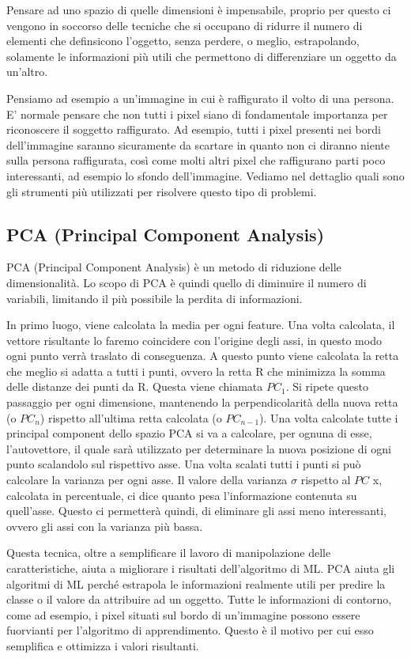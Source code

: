 \documentclass[12pt,italian]{report}
\begin{document}
Pensare ad uno spazio di quelle dimensioni è impensabile, proprio per questo ci vengono in soccorso delle tecniche che si occupano di ridurre il numero di elementi che definsicono l'oggetto, senza perdere, o meglio, estrapolando, solamente le informazioni più utili che permettono di differenziare un oggetto da un'altro.

Pensiamo ad esempio a un'immagine in cui è raffigurato il volto di una persona. E' normale pensare che non tutti i pixel siano di fondamentale importanza per riconoscere il soggetto raffigurato. Ad esempio, tutti i pixel presenti nei bordi dell'immagine saranno sicuramente da scartare in quanto non ci diranno niente sulla persona raffigurata, così come molti altri pixel che raffigurano parti poco interessanti, ad esempio lo sfondo dell'immagine. Vediamo nel dettaglio quali sono gli strumenti più utilizzati per risolvere questo tipo di problemi.


\subsection{PCA (Principal Component Analysis)}
PCA (Principal Component Analysis) è un metodo di riduzione delle dimensionalità. Lo scopo di PCA è quindi quello di diminuire il numero di variabili, limitando il più possibile la perdita di informazioni. 

In primo luogo, viene calcolata la media per ogni feature. Una volta calcolata, il vettore risultante lo faremo coincidere con l'origine degli assi, in questo modo ogni punto verrà traslato di conseguenza. A questo punto viene calcolata la retta che meglio si adatta a tutti i punti, ovvero la retta R che minimizza la somma delle distanze dei punti da R. Questa viene chiamata $ PC_{1} $. Si ripete questo passaggio per ogni dimensione, mantenendo la perpendicolarità della nuova retta (o $ PC_{n} $) rispetto all'ultima retta calcolata (o $ PC_{n-1} $). 
Una volta calcolate tutte i principal component dello spazio PCA si va a calcolare, per ognuna di esse, l'autovettore, il quale sarà utilizzato per determinare la nuova posizione di ogni punto scalandolo sul rispettivo asse. Una volta scalati tutti i punti si può calcolare la varianza per ogni asse. Il valore della varianza $\sigma$ rispetto al $ PC $ x, calcolata in percentuale, ci dice quanto pesa l'informazione contenuta su quell'asse. Questo ci permetterà quindi, di eliminare gli assi meno interessanti, ovvero gli assi con la varianza più bassa. 

Questa tecnica, oltre a semplificare il lavoro di manipolazione delle caratteristiche, aiuta a migliorare i risultati dell'algoritmo di ML. PCA aiuta gli algoritmi di ML perché estrapola le informazioni realmente utili per predire la classe o il valore da attribuire ad un oggetto. Tutte le informazioni di contorno, come ad esempio, i pixel situati sul bordo di un'immagine possono essere fuorvianti per l'algoritmo di apprendimento. Questo è il motivo per cui esso semplifica e ottimizza i valori risultanti.
\end{document}
